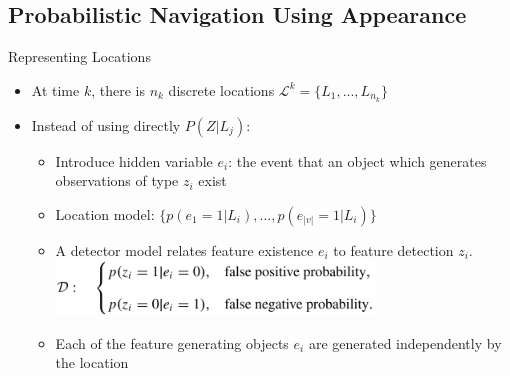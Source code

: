 \subsection{Probabilistic Navigation Using Appearance}
\begin{frame}{Representing Locations}
    \begin{itemize}
        \item At time $k$, there is $n_k$ discrete locations $\mathcal{L}^k=\{L_1,...,L_{n_k}\}$
        \item Instead of using directly $P(Z|L_j)$:
            \begin{itemize}
                \item Introduce hidden variable $e_i$: the event that an object which generates observations of type $z_i$ exist
                \item Location model: $\{p(e_1=1|L_i),...,p(e_{|v|}=1|L_i)\}$
                \item A detector model relates feature existence $e_i$ to feature detection $z_i$.
                    \includegraphics[width=0.7\textwidth]{./media/detector.png}
                \item Each of the feature generating objects $e_i$ are generated independently by the location
            \end{itemize}
    \end{itemize}
    \note[item]{}
\end{frame}

